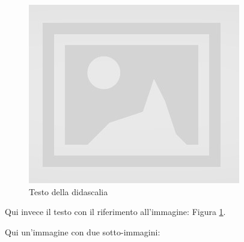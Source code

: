 \begin{figure}[H]
\centering
\includegraphics[scale=0.8]{images/placeholder.jpg}
\caption{Testo della didascalia}
\label{fig:figure1}
\end{figure}

Qui invece il testo con il riferimento all'immagine: Figura \ref{fig:figure1}.

Qui un'immagine con due sotto-immagini:


